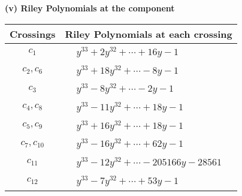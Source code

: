 \documentclass[1p]{elsarticle_modified}
\theoremstyle{definition}
\begin{document}
\newpage\renewcommand{\arraystretch}{1}
\flushleft \textbf{(v) Riley Polynomials at the component}\newline \\
\begin{tabular}{m{50pt}|m{274pt}}
Crossings & \hspace{64pt}Riley Polynomials at each crossing \\
\hline $$\begin{aligned}c_{1}\end{aligned}$$&$\begin{aligned}
&y^{33}+2 y^{32}+\cdots+16 y-1
\end{aligned}$\\
\hline $$\begin{aligned}c_{2},c_{6}\end{aligned}$$&$\begin{aligned}
&y^{33}+18 y^{32}+\cdots-8 y-1
\end{aligned}$\\
\hline $$\begin{aligned}c_{3}\end{aligned}$$&$\begin{aligned}
&y^{33}-8 y^{32}+\cdots-2 y-1
\end{aligned}$\\
\hline $$\begin{aligned}c_{4},c_{8}\end{aligned}$$&$\begin{aligned}
&y^{33}-11 y^{32}+\cdots+18 y-1
\end{aligned}$\\
\hline $$\begin{aligned}c_{5},c_{9}\end{aligned}$$&$\begin{aligned}
&y^{33}+16 y^{32}+\cdots+18 y-1
\end{aligned}$\\
\hline $$\begin{aligned}c_{7},c_{10}\end{aligned}$$&$\begin{aligned}
&y^{33}-16 y^{32}+\cdots+62 y-1
\end{aligned}$\\
\hline $$\begin{aligned}c_{11}\end{aligned}$$&$\begin{aligned}
&y^{33}-12 y^{32}+\cdots-205166 y-28561
\end{aligned}$\\
\hline $$\begin{aligned}c_{12}\end{aligned}$$&$\begin{aligned}
&y^{33}-7 y^{32}+\cdots+53 y-1
\end{aligned}$\\
\hline
\end{tabular}\\~\\
\end{document}
